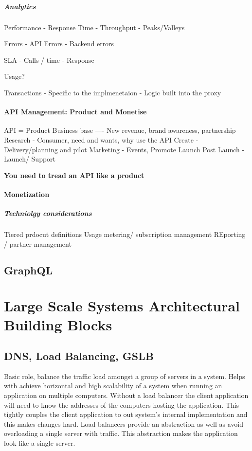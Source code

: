 \documentclass[a4paper, 11pt]{book}
\begin{document}
    \paragraph{Analytics}
    Performance
    - Response Time
    - Throughput
    - Peaks/Valleys

    Errors
    - API Errors
    - Backend errors

    SLA
    - Calls / time
    - Response

    Usage?

    Transactions
    - Specific to the implmenetaion
    - Logic built into the proxy

    \subsubsection{API Management: Product and Monetise}
    API = Product
    Business base ---- New revenue, brand awareness, partnership
    Research - Consumer, need and wants, why use the API
    Create - Delivery/planning and pilot
    Marketing - Events, Promote
    Launch Post Launch - Launch/ Support

    \textbf{You need to tread an API like a product}

    \subsubsection{Monetization}

    \paragraph{Techniolgy considerations}
    Tiered prdocut definitions
    Usage metering/ subscription management
    REporting /  partner management

    \section{GraphQL}

    


    \chapter{Large Scale Systems Architectural Building Blocks}


    \section{DNS, Load Balancing, GSLB}
    Basic role, balance the traffic load amongst a group of servers in a system.
    Helps with achieve horizontal and high scalability of a system when running an application on multiple computers.
    Without a load balancer the client application will need to know the addresses of the computers hosting the application.
    This tightly couples the client application to out system's internal implementation and this makes changes hard.
    Load balancers provide an abstraction as well as avoid overloading a single server with traffic.
    This abstraction makes the application look like a single server.
\end{document}
